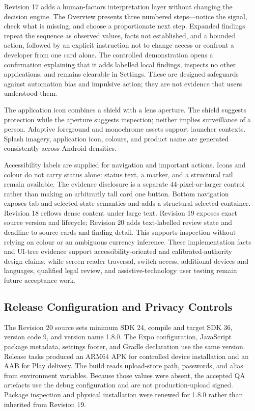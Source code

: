 Revision 17 adds a human-factors interpretation layer without changing the decision engine. The Overview presents three numbered steps---notice the signal, check what is missing, and choose a proportionate next step. Expanded findings repeat the sequence as observed values, facts not established, and a bounded action, followed by an explicit instruction not to change access or confront a developer from one card alone. The controlled demonstration opens a confirmation explaining that it adds labelled local findings, inspects no other applications, and remains clearable in Settings. These are designed safeguards against automation bias and impulsive action; they are not evidence that users understood them.

The application icon combines a shield with a lens aperture. The shield suggests protection while the aperture suggests inspection; neither implies surveillance of a person. Adaptive foreground and monochrome assets support launcher contexts. Splash imagery, application icon, colours, and product name are generated consistently across Android densities.

Accessibility labels are supplied for navigation and important actions. Icons and colour do not carry status alone: status text, a marker, and a structural rail remain available. The evidence disclosure is a separate 44-pixel-or-larger control rather than making an arbitrarily tall card one button. Bottom navigation exposes tab and selected-state semantics and adds a structural selected container. Revision 18 reflows dense content under large text. Revision 19 exposes exact source version and lifecycle; Revision 20 adds text-labelled review state and deadline to source cards and finding detail. This supports inspection without relying on colour or an ambiguous currency inference. These implementation facts and UI-tree evidence support accessibility-oriented and calibrated-authority design claims, while screen-reader traversal, switch access, additional devices and languages, qualified legal review, and assistive-technology user testing remain future acceptance work.

\subsection{Release Configuration and Privacy Controls}

The Revision 20 source sets minimum SDK 24, compile and target SDK 36, version code 9, and version name 1.8.0. The Expo configuration, JavaScript package metadata, settings footer, and Gradle declaration use the same version. Release tasks produced an ARM64 APK for controlled device installation and an AAB for Play delivery. The build reads upload-store path, passwords, and alias from environment variables. Because those values were absent, the accepted QA artefacts use the debug configuration and are not production-upload signed. Package inspection and physical installation were renewed for 1.8.0 rather than inherited from Revision 19.

